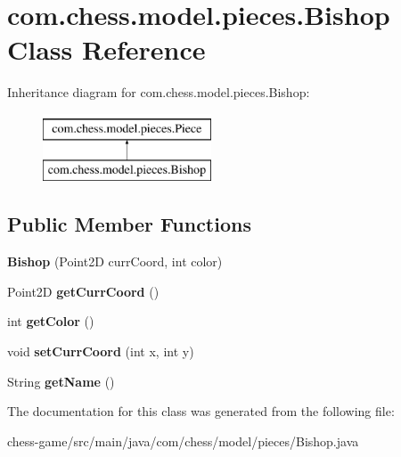 \hypertarget{classcom_1_1chess_1_1model_1_1pieces_1_1_bishop}{}\section{com.\+chess.\+model.\+pieces.\+Bishop Class Reference}
\label{classcom_1_1chess_1_1model_1_1pieces_1_1_bishop}
Inheritance diagram for com.\+chess.\+model.\+pieces.\+Bishop\+:\begin{figure}[H]
\begin{center}
\leavevmode
\includegraphics[height=2.000000cm]{classcom_1_1chess_1_1model_1_1pieces_1_1_bishop}
\end{center}
\end{figure}
\subsection*{Public Member Functions}
\begin{DoxyCompactItemize}
\item 
\mbox{\label{classcom_1_1chess_1_1model_1_1pieces_1_1_bishop_ade7b331bfd8e16fd5d92682fb05e35fd}} 
{\bfseries Bishop} (Point2D curr\+Coord, int color)
\item 
\mbox{\label{classcom_1_1chess_1_1model_1_1pieces_1_1_bishop_a9412cae97ca9090a5b728347e6658bc8}} 
Point2D {\bfseries get\+Curr\+Coord} ()
\item 
\mbox{\label{classcom_1_1chess_1_1model_1_1pieces_1_1_bishop_af00d7abf8aff6a62ddea76319f7603a8}} 
int {\bfseries get\+Color} ()
\item 
\mbox{\label{classcom_1_1chess_1_1model_1_1pieces_1_1_bishop_a65ac1439fd846e392f27c823eee5775c}} 
void {\bfseries set\+Curr\+Coord} (int x, int y)
\item 
\mbox{\label{classcom_1_1chess_1_1model_1_1pieces_1_1_bishop_aa2a418779f5006339065051570d12a5d}} 
String {\bfseries get\+Name} ()
\end{DoxyCompactItemize}


The documentation for this class was generated from the following file\+:\begin{DoxyCompactItemize}
\item 
chess-\/game/src/main/java/com/chess/model/pieces/Bishop.\+java\end{DoxyCompactItemize}
